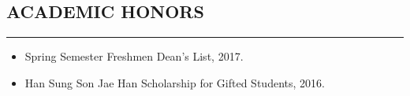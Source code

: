 \documentclass[10pt,a4]{article}
\begin{document}
\begin{small}
%	
%
%	
%
%


\subsection*{ACADEMIC HONORS}
\hrule
\vspace{0.2cm}
\begin{itemize}


\item Spring Semester Freshmen Dean's List, 2017.

\item Han Sung Son Jae Han Scholarship for Gifted Students, 2016.

\end{itemize}

\pagestyle{fancy}
\lhead{\textcolor{gray}{\it Junghyun Lee}}
\fancyfoot[C]{}



\end{small}
\end{document}
